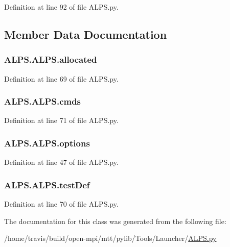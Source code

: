 Definition at line 92 of file A\-L\-P\-S.\-py.



\subsection{Member Data Documentation}
\hypertarget{class_a_l_p_s_1_1_a_l_p_s_ac371dce53e8c120f7031259025562bdb}{
\subsubsection[{allocated}]{\setlength{\rightskip}{0pt plus 5cm}A\-L\-P\-S.\-A\-L\-P\-S.\-allocated}}\label{class_a_l_p_s_1_1_a_l_p_s_ac371dce53e8c120f7031259025562bdb}


Definition at line 69 of file A\-L\-P\-S.\-py.

\hypertarget{class_a_l_p_s_1_1_a_l_p_s_a64bae95ba692ef4df06f716692b50ee9}{
\subsubsection[{cmds}]{\setlength{\rightskip}{0pt plus 5cm}A\-L\-P\-S.\-A\-L\-P\-S.\-cmds}}\label{class_a_l_p_s_1_1_a_l_p_s_a64bae95ba692ef4df06f716692b50ee9}


Definition at line 71 of file A\-L\-P\-S.\-py.

\hypertarget{class_a_l_p_s_1_1_a_l_p_s_a24dfa9b508f507c4cb6148f10a081555}{
\subsubsection[{options}]{\setlength{\rightskip}{0pt plus 5cm}A\-L\-P\-S.\-A\-L\-P\-S.\-options}}\label{class_a_l_p_s_1_1_a_l_p_s_a24dfa9b508f507c4cb6148f10a081555}


Definition at line 47 of file A\-L\-P\-S.\-py.

\hypertarget{class_a_l_p_s_1_1_a_l_p_s_a839c4f84a46683221d51004c08345ff2}{
\subsubsection[{test\-Def}]{\setlength{\rightskip}{0pt plus 5cm}A\-L\-P\-S.\-A\-L\-P\-S.\-test\-Def}}\label{class_a_l_p_s_1_1_a_l_p_s_a839c4f84a46683221d51004c08345ff2}


Definition at line 70 of file A\-L\-P\-S.\-py.



The documentation for this class was generated from the following file\-:\begin{DoxyCompactItemize}
\item 
/home/travis/build/open-\/mpi/mtt/pylib/\-Tools/\-Launcher/\hyperlink{_a_l_p_s_8py}{A\-L\-P\-S.\-py}\end{DoxyCompactItemize}
